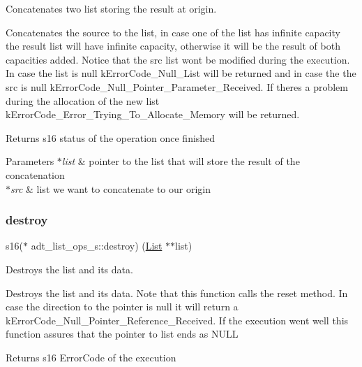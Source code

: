 Concatenates two list storing the result at origin. 

Concatenates the source to the list, in case one of the list has infinite capacity the result list will have infinite capacity, otherwise it will be the result of both capacities added. Notice that the src list won\textquotesingle{}t be modified during the execution. In case the list is null k\+Error\+Code\+\_\+\+Null\+\_\+\+List will be returned and in case the the src is null k\+Error\+Code\+\_\+\+Null\+\_\+\+Pointer\+\_\+\+Parameter\+\_\+\+Received. If there\textquotesingle{}s a problem during the allocation of the new list k\+Error\+Code\+\_\+\+Error\+\_\+\+Trying\+\_\+\+To\+\_\+\+Allocate\+\_\+\+Memory will be returned.

\begin{DoxyReturn}{Returns}
s16 status of the operation once finished 
\end{DoxyReturn}

\begin{DoxyParams}{Parameters}
{\em $\ast$list} & pointer to the list that will store the result of the concatenation \\
\hline
{\em $\ast$src} & list we want to concatenate to our origin \\
\hline
\end{DoxyParams}
\mbox{\label{structadt__list__ops__s_a946d68604826841c974d4a686973934c}} 
\subsubsection{\texorpdfstring{destroy}{destroy}}
{\footnotesize\ttfamily s16($\ast$ adt\+\_\+list\+\_\+ops\+\_\+s\+::destroy) (\hyperlink{structadt__list__s}{List} $\ast$$\ast$list)}



Destroys the list and it\textquotesingle{}s data. 

Destroys the list and its data. Note that this function calls the reset method. In case the direction to the pointer is null it will return a k\+Error\+Code\+\_\+\+Null\+\_\+\+Pointer\+\_\+\+Reference\+\_\+\+Received. If the execution went well this function assures that the pointer to list ends as N\+U\+LL

\begin{DoxyReturn}{Returns}
s16 Error\+Code of the execution 
\end{DoxyReturn}


